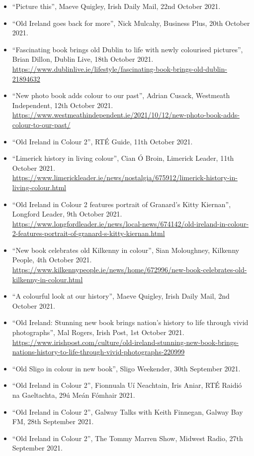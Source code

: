 \documentclass[10pt,a4paper]{res} %
\begin{document}
\begin{resume}
{\begin{itemize}
\item ``Picture this'', Maeve Quigley, Irish Daily Mail, 22nd October 2021.
\item ``Old Ireland goes back for more'', Nick Mulcahy, Business Plus, 20th October 2021.
\item ``Fascinating book brings old Dublin to life with newly colourised pictures'', Brian Dillon, Dublin Live, 18th October 2021. \url{https://www.dublinlive.ie/lifestyle/fascinating-book-brings-old-dublin-21894632}
\item ``New photo book adds colour to our past'', Adrian Cusack, Westmeath Independent, 12th October 2021. \url{https://www.westmeathindependent.ie/2021/10/12/new-photo-book-adds-colour-to-our-past/}
\item ``Old Ireland in Colour 2'', RT\'{E} Guide, 11th October 2021.
\item ``Limerick history in living colour'', Cian \'{O} Broin, Limerick Leader, 11th October 2021. \url{https://www.limerickleader.ie/news/nostalgia/675912/limerick-history-in-living-colour.html}
\item ``Old Ireland in Colour 2 features portrait of Granard's Kitty Kiernan'', Longford Leader, 9th October 2021. \url{https://www.longfordleader.ie/news/local-news/674142/old-ireland-in-colour-2-features-portrait-of-granard-s-kitty-kiernan.html}
\item ``New book celebrates old Kilkenny in colour'', Sian Moloughney, Kilkenny People, 4th October 2021. \url{https://www.kilkennypeople.ie/news/home/672996/new-book-celebrates-old-kilkenny-in-colour.html}
\item ``A colourful look at our history'', Maeve Quigley, Irish Daily Mail, 2nd October 2021.
\item ``Old Ireland: Stunning new book brings nation's history to life through vivid photographs'', Mal Rogers, Irish Post, 1st October 2021. \url{https://www.irishpost.com/culture/old-ireland-stunning-new-book-brings-nations-history-to-life-through-vivid-photographs-220999}
\item ``Old Sligo in colour in new book'', Sligo Weekender, 30th September 2021.
\item ``Old Ireland in Colour 2'', Fionnuala U\'{i} Neachtain, Iris Aniar, RT\'{E} Raidi\'{o} na Gaeltachta, 29\'{u} Me\'{a}n F\'{o}mhair 2021.
\item ``Old Ireland in Colour 2'', Galway Talks with Keith Finnegan, Galway Bay FM, 28th September 2021.
\item ``Old Ireland in Colour 2'', The Tommy Marren Show, Midwest Radio, 27th September 2021.

\end{itemize}}
\end{resume}
\end{document}
